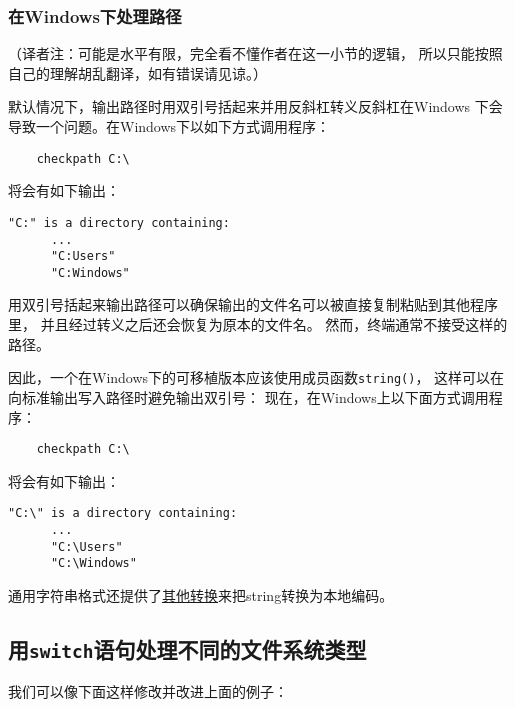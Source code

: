 \subsubsection{在Windows下处理路径}\label{ch20.1.1.1}
（译者注：可能是水平有限，完全看不懂作者在这一小节的逻辑，
所以只能按照自己的理解胡乱翻译，如有错误请见谅。）

默认情况下，输出路径时用双引号括起来并用反斜杠转义反斜杠在Windows
下会导致一个问题。在Windows下以如下方式调用程序：
\begin{lstlisting}
    checkpath C:\
\end{lstlisting}
将会有如下输出：
\begin{lstlisting}[stringstyle=\color{black}]
    "C:" is a directory containing:
      ...
      "C:Users"
      "C:Windows"
\end{lstlisting}
用双引号括起来输出路径可以确保输出的文件名可以被直接复制粘贴到其他程序里，
并且经过转义之后还会恢复为原本的文件名。
然而，终端通常不接受这样的路径。

因此，一个在Windows下的可移植版本应该使用成员函数\texttt{string()}，
这样可以在向标准输出写入路径时避免输出双引号：
现在，在Windows上以下面方式调用程序：
\begin{lstlisting}
    checkpath C:\
\end{lstlisting}
将会有如下输出：
\begin{lstlisting}[stringstyle=\color{black}]
    "C:\" is a directory containing:
      ...
      "C:\Users"
      "C:\Windows"
\end{lstlisting}
通用字符串格式还提供了\hyperref[ch20.3.4]{其他转换}来把string转换为本地编码。

\subsection{用\texttt{switch}语句处理不同的文件系统类型}
我们可以像下面这样修改并改进上面的例子：


